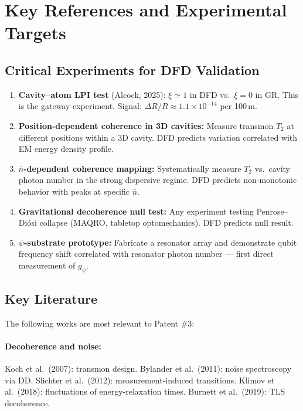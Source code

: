 \documentclass[11pt,letterpaper]{article}
\begin{document}
\section{Key References and Experimental Targets}

\subsection{Critical Experiments for DFD Validation}

\begin{enumerate}
\item \textbf{Cavity--atom LPI test} (Alcock, 2025): $\xi \simeq 1$ in
DFD vs.\ $\xi = 0$ in GR. This is the gateway experiment. Signal:
$\Delta R/R \approx 1.1 \times 10^{-14}$ per 100\,m.

\item \textbf{Position-dependent coherence in 3D cavities:} Measure
transmon $T_2$ at different positions within a 3D cavity. DFD predicts
variation correlated with EM energy density profile.

\item \textbf{$\bar{n}$-dependent coherence mapping:} Systematically
measure $T_2$ vs.\ cavity photon number in the strong dispersive regime.
DFD predicts non-monotonic behavior with peaks at specific $\bar{n}$.

\item \textbf{Gravitational decoherence null test:} Any experiment
testing Penrose--Di\'osi collapse (MAQRO, tabletop optomechanics). DFD
predicts null result.

\item \textbf{$\psi$-substrate prototype:} Fabricate a resonator array
and demonstrate qubit frequency shift correlated with resonator photon
number --- first direct measurement of $g_\psi$.
\end{enumerate}

\subsection{Key Literature}

The following works are most relevant to Patent \#3:

\paragraph{Decoherence and noise:}
Koch et al.\ (2007): transmon design.
Bylander et al.\ (2011): noise spectroscopy via DD.
Slichter et al.\ (2012): measurement-induced transitions.
Klimov et al.\ (2018): fluctuations of energy-relaxation times.
Burnett et al.\ (2019): TLS decoherence.
\end{document}
